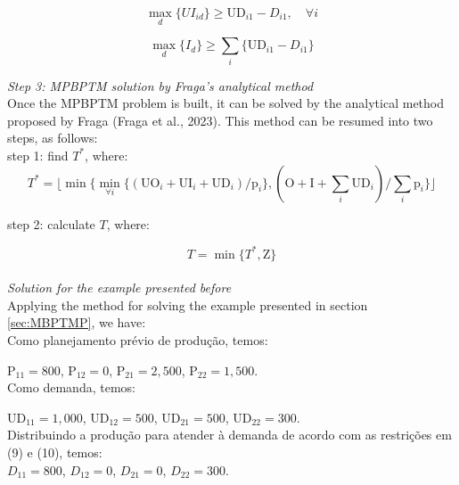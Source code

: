 \documentclass[authoryear,preprint,12pt]{elsarticle}
\begin{document}
\begin{equation}
\max_d\{UI_{id}\} \geq \textrm{UD}_{i1} - D_{i1}, \quad \forall i
\end{equation}

\begin{equation}
\max_d\{I_{d}\} \geq \sum_{i}\{ \textrm{UD}_{i1} - D_{i1} \}
\end{equation}

\emph{Step 3: MPBPTM solution by Fraga's analytical method} \\

Once the MPBPTM problem is built, it can be solved by the analytical method proposed by Fraga (Fraga et al., 2023). This method can be resumed into two steps, as follows: \\

step 1: find $T^*$, where:
\begin{equation}
T^* = \lfloor{\min \{\min_{\forall i} \{(\textrm{UO}_i + \textrm{UI}_i + \textrm{UD}_i) / \textrm{p}_i\},(\textrm{O} + \textrm{I} + \sum_i \textrm{UD}_i) / \sum_i {\textrm{p}_i}\}}\rfloor
\end{equation}

step 2: calculate $T$, where: 

\begin{equation}
T = \min \{T^* , \textrm{Z}\}
\end{equation} \\

\emph{Solution for the example presented before} \\

Applying the method for solving the example presented in section \ref{sec:MBPTMP}, we have: \\

Como planejamento prévio de produção, temos:

$\textrm{P}_{11} = 800$,
$\textrm{P}_{12} = 0$,
$\textrm{P}_{21} = 2,500$,
$\textrm{P}_{22} = 1,500$. \\

Como demanda, temos:

$\textrm{UD}_{11} = 1,000$,
$\textrm{UD}_{12} = 500$,
$\textrm{UD}_{21} = 500$,
$\textrm{UD}_{22} = 300$. \\

Distribuindo a produção para atender à demanda de acordo com as restrições em (9) e (10), temos: \\

$D_{11} = 800$,
$D_{12} = 0$,
$D_{21} = 0$,
$D_{22} = 300$. \\
\end{document}
